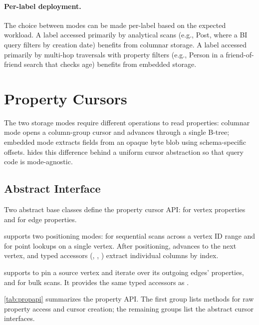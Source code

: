 \paragraph{Per-label deployment.}
The choice between modes can be made per-label based on the expected workload.
A label accessed primarily by analytical scans (e.g., Post, where a BI query filters by creation date) benefits from columnar storage.
A label accessed primarily by multi-hop traversals with property filters (e.g., Person in a friend-of-friend search that checks age) benefits from embedded storage.

\section{Property Cursors}
\label{arch:prop-cursors}

The two storage modes require different \wt{} operations to read properties: columnar mode opens a column-group cursor and advances through a single B-tree; embedded mode extracts fields from an opaque byte blob using schema-specific offsets.
\project{} hides this difference behind a uniform cursor abstraction so that query code is mode-agnostic.

\subsection{Abstract Interface}
\label{arch:prop-cursors:interface}

Two abstract base classes define the property cursor \ac{API}:  for vertex properties and  for edge properties.

 supports two positioning modes:  for sequential scans across a vertex ID range and  for point lookups on a single vertex.
After positioning,  advances to the next vertex, and typed accessors (, , ) extract individual columns by index.

 supports  to pin a source vertex and iterate over its outgoing edges' properties, and  for bulk scans.
It provides the same typed accessors as .

\autoref{tab:propapi} summarizes the property \ac{API}.
The first group lists  methods for raw property access and cursor creation; the remaining groups list the abstract cursor interfaces.

